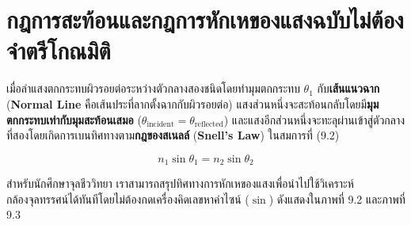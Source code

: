 \section{กฎการสะท้อนและกฎการหักเหของแสงฉบับไม่ต้องจำตรีโกณมิติ}


เมื่อลำแสงตกกระทบผิวรอยต่อระหว่างตัวกลางสองชนิดโดยทำมุมตกกระทบ $\theta_1$ กับ\textbf{เส้นแนวฉาก} (\textbf{Normal Line} คือเส้นประที่ลากตั้งฉากกับผิวรอยต่อ) แสงส่วนหนึ่งจะสะท้อนกลับโดยมี\textbf{มุมตกกระทบเท่ากับมุมสะท้อนเสมอ} ($\theta_{\text{incident}} = \theta_{\text{reflected}}$) และแสงอีกส่วนหนึ่งจะทะลุผ่านเข้าสู่ตัวกลางที่สองโดยเกิดการเบนทิศทางตาม\textbf{กฎของสเนลล์} (\textbf{Snell's Law}) ในสมการที่ (9.2)

\begin{equation}
    n_1 \sin\theta_1 = n_2 \sin\theta_2
\end{equation}

สำหรับนักศึกษาจุลชีววิทยา เราสามารถสรุปทิศทางการหักเหของแสงเพื่อนำไปใช้วิเคราะห์กล้องจุลทรรศน์ได้ทันทีโดยไม่ต้องกดเครื่องคิดเลขหาค่าไซน์ ($\sin$) ดังแสดงใน\mbox{ภาพที่} 9.2 และ\mbox{ภาพที่} 9.3

